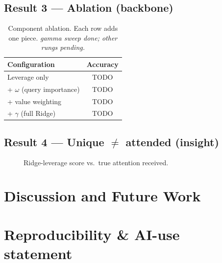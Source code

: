 \documentclass{article}
\begin{document}
\subsection{Result 3 --- Ablation (backbone)}
\label{sec:res-ablation}
\begin{table}[t]
  \centering
  \caption{Component ablation. Each row adds one piece. \textit{gamma sweep done;
    other rungs pending.}}
  \label{tab:ablation}
  \begin{tabular}{lc}
    \toprule
    Configuration & Accuracy \\
    \midrule
    Leverage only            & TODO \\
    \quad + $\omega$ (query importance) & TODO \\
    \quad + value weighting  & TODO \\
    \quad + $\gamma$ (full Ridge) & TODO \\
    \bottomrule
  \end{tabular}
\end{table}

\subsection{Result 4 --- Unique $\neq$ attended (insight)}
\label{sec:res-insight}
\begin{figure}[t]
  \centering
  \caption{Ridge-leverage score vs.\ true attention received.}
  \label{fig:leverage-vs-attn}
\end{figure}

\section{Discussion and Future Work}
\label{sec:future}

\section*{Reproducibility \& AI-use statement}
\end{document}
